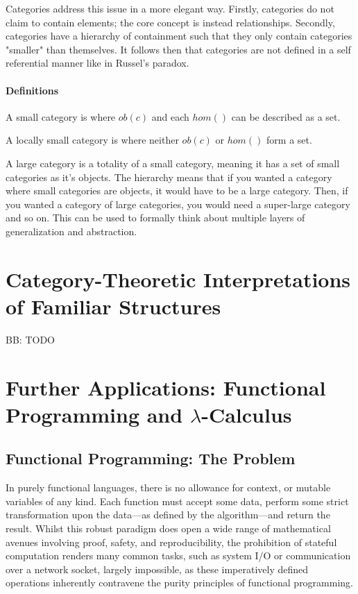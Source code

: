 \documentclass[10pt,a4paper]{amsart}
\begin{document}
Categories address this issue in a more elegant way.
Firstly, categories do not claim to contain elements; the core concept is instead relationships.
Secondly, categories have a hierarchy of containment such that they only contain categories "smaller" than themselves.
It follows then that categories are not defined in a self referential manner like in Russel's paradox.
\paragraph{Definitions}
A small category is where $ob(c)$ and each $hom()$ can be described as a set.

A locally small category is where neither $ob(c)$ or $hom()$ form a set. 

A large category is a totality of a small category, meaning it has a set of small categories as it's objects.
The hierarchy means that if you wanted a category where small categories are objects,
it would have to be a large category.
Then, if you wanted a category of large categories, you would need a super-large category and so on.
This can be used to formally think about multiple layers of generalization and abstraction.
\section{Category-Theoretic %
        Interpretations of Familiar Structures}
BB: TODO

\section{Further Applications: %
        Functional Programming and \texorpdfstring{$\lambda$}{Lambda}-Calculus}
\subsection{Functional Programming: The Problem} In purely functional languages,
there is no allowance for context, or mutable variables of any kind. Each
function must accept some data, perform some strict transformation upon the
data---as defined by the algorithm---and return the result. Whilst this robust
paradigm does open a wide range of mathematical avenues involving proof, safety,
and reproducibility, the prohibition of stateful computation renders many common
tasks, such as system I/O or communication over a network socket, largely
impossible, as these imperatively defined operations inherently contravene the
purity principles of functional programming.
\end{document}
